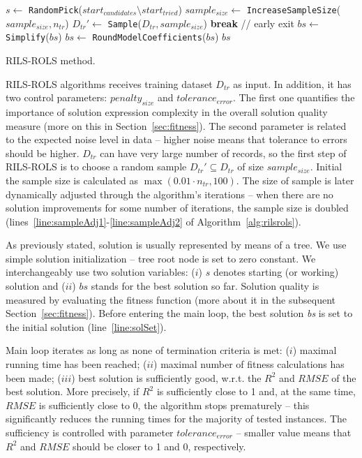 \documentclass[a4paper,12pt]{elsarticle}
\begin{document}
\begin{algorithm}
\begin{algorithmic}[1]
   				\EndIf
   				\State $s \gets $ \texttt{RandomPick}($start_{candidates} \setminus start_{tried}$) \label{line:randPick}
   					\State $sample_{size} \gets$ \texttt{IncreaseSampleSize}($sample_{size}, n_{tr}$) \label{line:sampleAdj1}
   					\State $D_{tr}' \gets$ \texttt{Sample}($D_{tr}, sample_{size}$)\label{line:sampleAdj2}
   				\EndIf
   			\EndIf
   				\State \textbf{break} // early exit
   			\EndIf
   		\EndWhile
   		\State $bs \gets $ \texttt{Simplify}($bs$)
   		\State $bs \gets $ \texttt{RoundModelCoefficients}($bs$)
   		\State \Return $bs$
   		\EndProcedure
   	\end{algorithmic}
   	\caption{RILS-ROLS method.}
   	\label{alg:rilsrols}
   \end{algorithm}  

RILS-ROLS algorithms receives training dataset $D_{tr}$ as input. In addition, it has two control parameters: $penalty_{size}$ and $tolerance_{error}$. The first one quantifies the importance of solution expression complexity in the overall solution quality measure (more on this in Section~\ref{sec:fitness}). The second parameter is related to the expected noise level in data -- higher noise means that tolerance to errors should be higher.
 $D_{tr}$ can have very large number of records, so the first step of RILS-ROLS is to choose a random sample $D_{tr}' \subseteq D_{tr}$ of size $sample_{size}$. Initial the sample size is calculated as $\max(0.01 \cdot n_{tr}, 100)$. The size of sample is later dynamically adjusted through the algorithm's iterations -- when there are no solution improvements for some number of iterations, the sample size is doubled (lines~\ref{line:sampleAdj1}-\ref{line:sampleAdj2} of Algorithm~\ref{alg:rilsrols}).


As previously stated, solution is usually represented by means of a tree. We use simple solution initialization -- tree root node is set to zero constant. We interchangeably use two solution variables: ($i$) $s$ denotes starting (or working) solution and ($ii$) $bs$ stands for the best solution so far. Solution quality is measured by evaluating the fitness function (more about it in the subsequent Section~\ref{sec:fitness}). Before entering the main loop, the best solution \emph{bs} is set to the initial solution (line~\ref{line:solSet}).


Main loop iterates as long as none of termination criteria is met: ($i$) maximal running time has been reached; ($ii$) maximal number of fitness calculations has been made; ($iii$) best solution is sufficiently good, 
w.r.t. the $R^2$ and $RMSE$ of the best solution. More precisely, if $R^2$ is sufficiently close to 1 and, at the same time, $RMSE$ is sufficiently close to 0, the algorithm stops prematurely -- this significantly reduces the running times for the majority of tested instances.
The sufficiency is controlled with parameter $tolerance_{error}$ -- smaller value means that $R^2$ and $RMSE$ should be closer to 1 and 0, respectively. 
\end{document}
